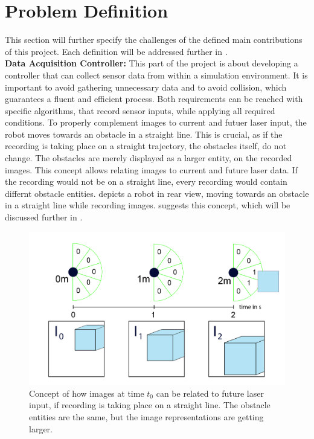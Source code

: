 \section{Problem Definition \label{ProblemDefinition} }
This section will further specify the challenges of the defined main contributions of this project. Each definition will be addressed further in .\\

\textbf{Data Acquisition Controller:} This part of the project is about developing a controller that can collect sensor data from within a simulation environment. It is important to avoid gathering unnecessary data and to avoid collision, which guarantees a fluent and efficient process. Both requirements can be reached with specific algorithms, that record sensor inputs, while applying all required conditions. To properly complement images to current and futuer laser input, the robot moves towards an obstacle in a straight line. This is crucial, as if the recording is taking place on a straight trajectory, the obstacles itself, do not change. The obstacles are merely displayed as a larger entity, on the recorded images. This concept allows relating images to current and future laser data. If the recording would not be on a straight line, every recording would contain differnt obstacle entities.  depicts a robot in rear view, moving towards an obstacle in a straight line while recording images.\cite{nava2019learning} suggests this concept, which will be discussed further in .

\begin{figure}[h]%
\centering
\captionsetup{width=.75\linewidth}
\includegraphics[width=0.75\linewidth]{Bilder/Relate_data.png} 
\caption{Concept of how images at time $t_{0}$ can be related to future laser input, if recording is taking place on a straight line. The obstacle entities are the same, but the image representations are getting larger.}
\label{relate_data}
\end{figure}

